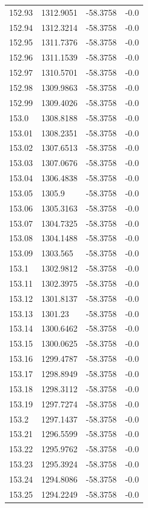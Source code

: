 \begin{table}[H]
\begin{tabular}{llll}
152.93 & 1312.9051 & -58.3758 & -0.0 \\
152.94 & 1312.3214 & -58.3758 & -0.0 \\
152.95 & 1311.7376 & -58.3758 & -0.0 \\
152.96 & 1311.1539 & -58.3758 & -0.0 \\
152.97 & 1310.5701 & -58.3758 & -0.0 \\
152.98 & 1309.9863 & -58.3758 & -0.0 \\
152.99 & 1309.4026 & -58.3758 & -0.0 \\
153.0 & 1308.8188 & -58.3758 & -0.0 \\
153.01 & 1308.2351 & -58.3758 & -0.0 \\
153.02 & 1307.6513 & -58.3758 & -0.0 \\
153.03 & 1307.0676 & -58.3758 & -0.0 \\
153.04 & 1306.4838 & -58.3758 & -0.0 \\
153.05 & 1305.9 & -58.3758 & -0.0 \\
153.06 & 1305.3163 & -58.3758 & -0.0 \\
153.07 & 1304.7325 & -58.3758 & -0.0 \\
153.08 & 1304.1488 & -58.3758 & -0.0 \\
153.09 & 1303.565 & -58.3758 & -0.0 \\
153.1 & 1302.9812 & -58.3758 & -0.0 \\
153.11 & 1302.3975 & -58.3758 & -0.0 \\
153.12 & 1301.8137 & -58.3758 & -0.0 \\
153.13 & 1301.23 & -58.3758 & -0.0 \\
153.14 & 1300.6462 & -58.3758 & -0.0 \\
153.15 & 1300.0625 & -58.3758 & -0.0 \\
153.16 & 1299.4787 & -58.3758 & -0.0 \\
153.17 & 1298.8949 & -58.3758 & -0.0 \\
153.18 & 1298.3112 & -58.3758 & -0.0 \\
153.19 & 1297.7274 & -58.3758 & -0.0 \\
153.2 & 1297.1437 & -58.3758 & -0.0 \\
153.21 & 1296.5599 & -58.3758 & -0.0 \\
153.22 & 1295.9762 & -58.3758 & -0.0 \\
153.23 & 1295.3924 & -58.3758 & -0.0 \\
153.24 & 1294.8086 & -58.3758 & -0.0 \\
153.25 & 1294.2249 & -58.3758 & -0.0 \\

\end{tabular}
\end{table}
